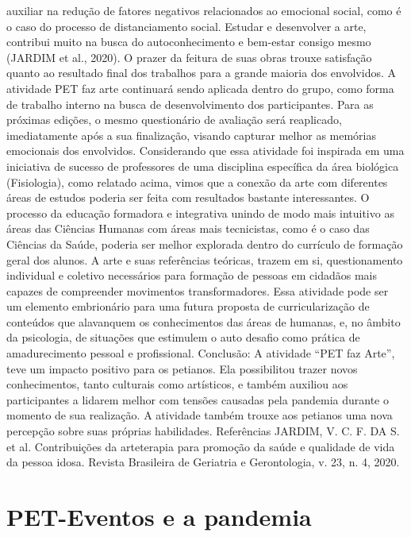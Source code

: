 auxiliar na redução de fatores negativos relacionados ao emocional social, como é o caso do 
processo de distanciamento social. Estudar e desenvolver a arte, contribui muito na busca do
autoconhecimento e bem-estar consigo mesmo (JARDIM et al., 2020). O prazer da feitura de suas 
obras trouxe satisfação quanto ao resultado final dos trabalhos para a grande maioria dos 
envolvidos. A atividade PET faz arte continuará sendo aplicada dentro do grupo, como forma de 
trabalho interno na busca de desenvolvimento dos participantes. Para as próximas edições, o 
mesmo questionário de avaliação será reaplicado, imediatamente após a sua finalização, visando 
capturar melhor as memórias emocionais dos envolvidos. Considerando que essa atividade foi 
inspirada em uma iniciativa de sucesso de professores de uma disciplina específica da área 
biológica (Fisiologia), como relatado acima, vimos que a conexão da arte com diferentes áreas de 
estudos poderia ser feita com resultados bastante interessantes. O processo da educação formadora 
e integrativa unindo de modo mais intuitivo as áreas das Ciências Humanas com áreas mais 
tecnicistas, como é o caso das Ciências da Saúde, poderia ser melhor explorada dentro do currículo 
de formação geral dos alunos. A arte e suas referências teóricas, trazem em si, questionamento 
individual e coletivo necessários para formação de pessoas em cidadãos mais capazes de 
compreender movimentos transformadores. Essa atividade pode ser um elemento embrionário para 
uma futura proposta de curricularização de conteúdos que alavanquem os conhecimentos das áreas 
de humanas, e, no âmbito da psicologia, de situações que estimulem o auto desafio como prática 
de amadurecimento pessoal e profissional. Conclusão: A atividade “PET faz Arte”, teve um 
impacto positivo para os petianos. Ela possibilitou trazer novos conhecimentos, tanto culturais 
como artísticos, e também auxiliou aos participantes a lidarem melhor com tensões causadas pela 
pandemia durante o momento de sua realização. A atividade também trouxe aos petianos uma nova 
percepção sobre suas próprias habilidades. 
Referências 
JARDIM, V. C. F. DA S. et al. Contribuições da arteterapia para promoção da saúde e qualidade 
de vida da pessoa idosa. Revista Brasileira de Geriatria e Gerontologia, v. 23, n. 4, 2020.



\section{PET-Eventos e a pandemia}


